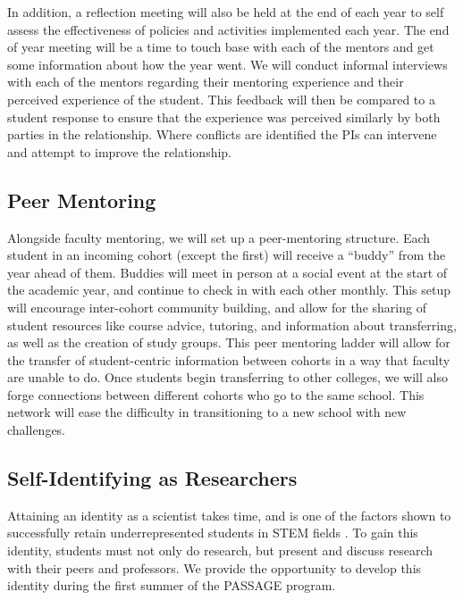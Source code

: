 \documentclass[12pt]{article}
\begin{document}
In addition, a reflection meeting will also be held at the end of each year to self assess the effectiveness of policies and activities implemented each year.  The end of year meeting will be a time to touch base with each of the mentors and get some information about how the year went.  We will conduct informal interviews with each of the mentors regarding their mentoring experience and their perceived experience of the student.  This feedback will then be compared to a student response to ensure that the experience was perceived similarly by both parties in the relationship.  Where conflicts are identified the PIs can intervene and attempt to improve the relationship.
\vspace{-3mm}

\subsection{Peer Mentoring}

Alongside faculty mentoring, we will set up a peer-mentoring structure.  Each student in an incoming cohort (except the first) will receive a ``buddy'' from the year ahead of them.  Buddies will meet in person at a social event at the start of the academic year, and continue to check in with each other monthly.  This setup will encourage inter-cohort community building, and allow for the sharing of student resources like course advice, tutoring, and information about transferring, as well as the creation of study groups. This peer mentoring ladder will allow for the transfer of student-centric information between cohorts in a way that faculty are unable to do.   Once students begin transferring to other colleges, we will also forge connections between different cohorts who go to the same school.  This network will ease the difficulty in transitioning to a new school with new challenges.  
\vspace{-3mm}

\subsection{Self-Identifying as Researchers}

Attaining an identity as a scientist takes time, and is one of the factors shown to successfully retain underrepresented students in STEM fields \citep{Hurtado09,Johnson11,Rodriguez}.  To gain this identity, students must not only do research, but present and discuss research with their peers and professors.   We provide the opportunity to develop this identity during the first summer of the PASSAGE program.  
\end{document}
